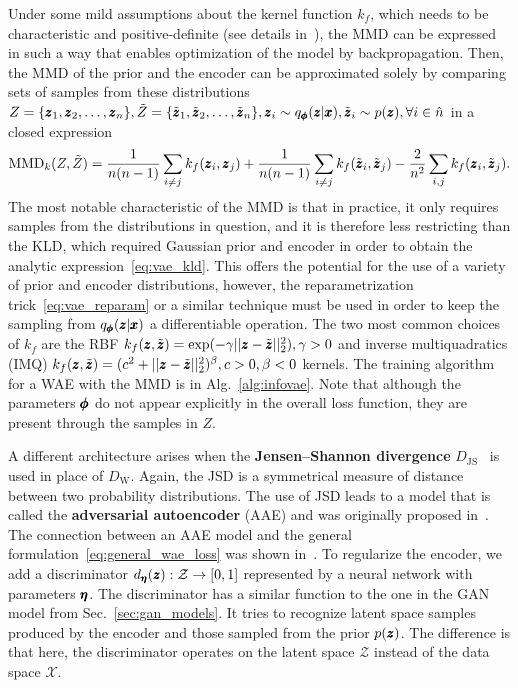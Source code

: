 Under some mild assumptions about the kernel function $k_f$, which needs to be characteristic and positive-definite (see details in~\cite{tolstikhin2017wasserstein}), the MMD can be expressed in such a way that enables optimization of the model by backpropagation. Then, the MMD of the prior and the encoder can be approximated solely by comparing sets of samples from these distributions $Z=\{\pmb{{z}}_{1}, \pmb{{z}}_{2}, \ldots, \pmb{{z}}_{n}\}, \tilde{Z}=\{\tilde{\pmb{{z}}}_{1}, \tilde{\pmb{{z}}}_{2}, \ldots, \tilde{\pmb{{z}}}_{n}\},\pmb{{z}}_{i}\sim q_{\pmb{{\phi}}}(\pmb{{z}}|\pmb{{x}}),\tilde{\pmb{{z}}}_{i} \sim p(\pmb{{z}}),\forall i \in \hat{n}$ in a closed expression
\begin{equation} \label{eq:mmd}
\text{MMD}_{k}(Z,\tilde{Z})=\frac{1}{n(n-1)}\sum_{i\neq j}k_f(\pmb{{z}}_{i},\pmb{{z}}_{j})+\frac{1}{n(n-1)}\sum_{i\neq j}k_f(\tilde{\pmb{{z}}}_{i},\tilde{\pmb{{z}}}_{j})-\frac{2}{n^{2}}\sum_{i,j}k_f(\pmb{{z}}_{i}, \tilde{\pmb{{z}}}_{j}).
\end{equation}
The most notable characteristic of the MMD is that in practice, it only requires samples from the distributions in question, and it is therefore less restricting than the KLD, which required Gaussian prior and encoder in order to obtain the analytic expression~\eqref{eq:vae_kld}. This offers the potential for the use of a variety of prior and encoder distributions, however, the reparametrization trick~\eqref{eq:vae_reparam} or a similar technique must be used in order to keep the sampling from $q_{\pmb{{\phi}}}(\pmb{{z}}|\pmb{{x}})$ a differentiable operation. The two most common choices of $k_f$ are the RBF $k_f(\pmb{{z}},\tilde{\pmb{{z}}}) = \exp(- \gamma \vert \vert \pmb{{z}} - \tilde{\pmb{{z}}} \vert \vert_2^2), \gamma > 0$ and inverse multiquadratics (IMQ) $k_f(\pmb{{z}},\tilde{\pmb{{z}}}) = (c^2 +  \vert \vert \pmb{{z}} - \tilde{\pmb{{z}}} \vert \vert_2^2)^\beta, c>0, \beta < 0$ kernels. The training algorithm for a WAE with the MMD is in Alg.~\ref{alg:infovae}. Note that although the parameters $\pmb{{\phi}}$ do not appear explicitly in the overall loss function, they are present through the samples in $Z$. 

A different architecture arises when the \textbf{Jensen--Shannon divergence} $D_{\text{JS}}$~\cite{barranco1994texture} is used in place of $D_{\text{W}}$. Again, the JSD is a symmetrical measure of distance between two probability distributions. The use of JSD leads to a model that is called the \textbf{adversarial autoencoder} (AAE) and was originally proposed in~\cite{makhzani2015adversarial}. The connection between an AAE model and the general formulation~\eqref{eq:general_wae_loss} was shown in~\cite{tolstikhin2017wasserstein}. To regularize the encoder, we add a discriminator $d_{\vc{\eta}}(\vc{z}):\mathcal{Z}\rightarrow\left[0,1\right]$ represented by a neural network with parameters $\pmb{{\eta}}$. The discriminator has a similar function to the one in the GAN model from Sec.~\ref{sec:gan_models}. It tries to recognize latent space samples produced by the encoder and those sampled from the prior $p(\pmb{{z}})$. The difference is that here, the discriminator operates on the latent space $\mathcal{Z}$ instead of the data space $\mathcal{X}$. 


